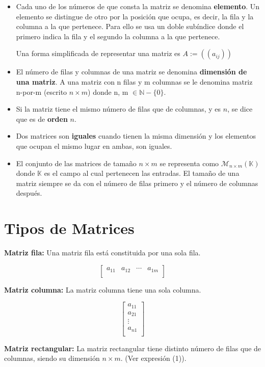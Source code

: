 \documentclass[10pt]{article}
\begin{document}
\begin{itemize}
 \item Cada uno de los números de que consta la matriz se denomina \textbf{elemento}. Un elemento se distingue de otro por la posición que ocupa, es decir, la fila y la columna a la que pertenece. Para ello se usa un doble subíndice donde el primero indica la fila y el segundo la columna a la que pertenece.
 
 Una forma simplificada de representar una matriz es $A:= ((a_{ij}))$
 \item El número de filas y columnas de una matriz se denomina \textbf{dimensión de una matriz}. A una matriz con n filas y m columnas se le denomina matriz n-por-m (escrito $n\times{m}$) donde n, m $\in{\mathbb{N}} - \{0\}$.
 \item Si la matriz tiene el mismo número de filas que de columnas, y es $n$, se dice que es de \textbf{orden} $n$.
 \item Dos matrices son \textbf{iguales} cuando tienen la misma dimensión y los elementos que ocupan el mismo lugar en ambas, son iguales.
 \item El conjunto de las matrices de tamaño $n \times{m}$ se representa como $\mathcal{M}_{n\times {m}}(\mathbb{K})$ donde $\mathbb{K}$ es el campo al cual pertenecen las entradas. El tamaño de una matriz siempre se da con el número de filas primero y el número de columnas después.
 \end {itemize}
 
\section{Tipos de Matrices}

\noindent\textbf{Matriz fila:} Una matriz fila está constituida por una sola fila.

\[\begin{bmatrix}
a_{11} & a_{12} & \cdots & a_{1m} \\
\end{bmatrix}\]

\noindent\textbf{Matriz columna:} La matriz columna tiene una sola columna.

\[\begin{bmatrix}
a_{11} \\
a_{21} \\
\vdots \\
a_{n1} \\
\end{bmatrix}\]

\textbf{Matriz rectangular:} La matriz rectangular tiene distinto número de filas que de columnas, siendo su dimensión $n\times {m}$. (Ver expresión (1)).
\end{document}
